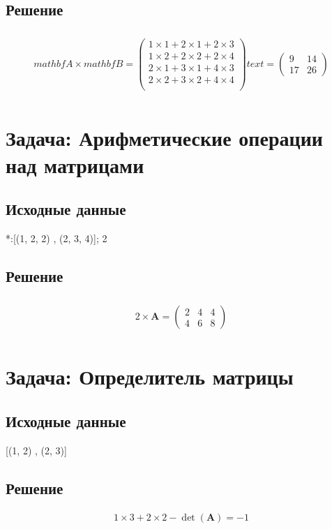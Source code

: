 \documentclass{article}
\begin{document}
\subsection{Решение}
\begin{align*}\\
mathbf{A} \times mathbf{B} = 
\begin{pmatrix}
1 \times 1 + 2 \times 1 + 2 \times 3\\
1 \times 2 + 2 \times 2 + 2 \times 4\\
2 \times 1 + 3 \times 1 + 4 \times 3\\
2 \times 2 + 3 \times 2 + 4 \times 4\\
\end{pmatrix}
text{=}
\begin{pmatrix}
9 & 14\\
17 & 26\end{pmatrix}
\\\end{align*}
\section{Задача: Арифметические операции над матрицами}
\subsection{Исходные данные}
*:[(1, 2, 2) ,  (2, 3, 4)]; 2
\subsection{Решение}
\begin{align*}\\
2 \times \mathbf{A} = 
\begin{pmatrix}
2 & 4 & 4\\
4 & 6 & 8\end{pmatrix}
\\\end{align*}
\section{Задача: Определитель матрицы}
\subsection{Исходные данные}
[(1, 2) ,  (2, 3)]
\subsection{Решение}
\begin{align*}
1 \times 3 +
2 \times 2 -
\det(\mathbf{A}) = -1
\end{align*}
\end{document}
